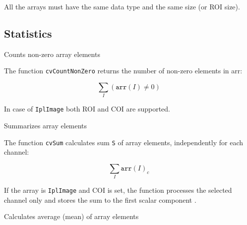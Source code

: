 All the arrays must have the same data type and the same size (or ROI size).

\subsection{Statistics}

\label{CountNonZero}

Counts non-zero array elements


\begin{description}
\end{description}


The function \texttt{cvCountNonZero} returns the number of non-zero elements in arr:

\[ \sum_I (\texttt{arr}(I) \ne 0) \]

In case of \texttt{IplImage} both ROI and COI are supported.


\label{Sum}

Summarizes array elements


\begin{description}
\end{description}


The function \texttt{cvSum} calculates sum \texttt{S} of array elements, independently for each channel:

\[ \sum_I \texttt{arr}(I)_c \]

If the array is \texttt{IplImage} and COI is set, the function processes the selected channel only and stores the sum to the first scalar component
.


\label{Avg}

Calculates average (mean) of array elements


\begin{description}
\end{description}



